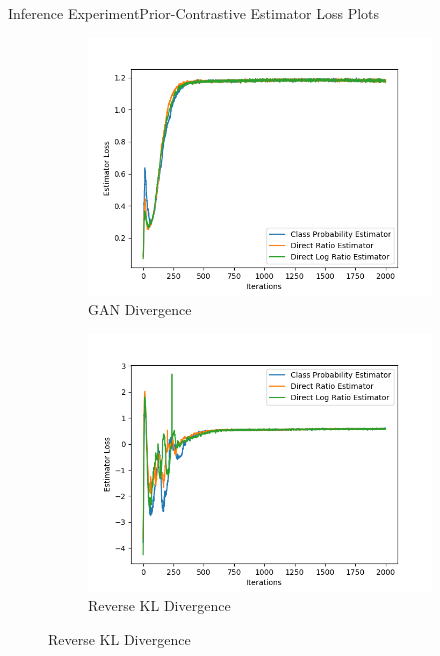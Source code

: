 \documentclass{beamer}
\begin{document}
\begin{frame}{Inference Experiment}{Prior-Contrastive Estimator Loss Plots}
\begin{figure}
\begin{subfigure}{0.49\textwidth}
\includegraphics[width=\linewidth]{part2estimatorlosses/PCADVvsPCADVexpvsPCADVgudlog.png}
\caption{GAN Divergence}
\end{subfigure}
\begin{subfigure}{0.49\textwidth}
\includegraphics[width=\linewidth]{part2estimatorlosses/PCKLDvsPCKLexpvsPCKLgudlog.png}
\caption{Reverse KL Divergence}
\end{subfigure}
\end{figure}
\end{frame}
\end{document}
